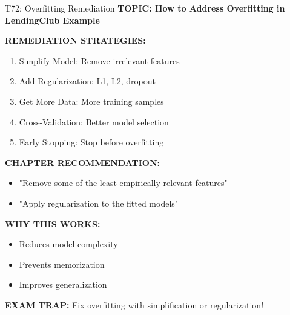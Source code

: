 \documentclass[8pt]{beamer}
\begin{document}
	\begin{frame}{T72: Overfitting Remediation}
		\fontsize{6.5}{7.5}\selectfont
		\textbf{TOPIC: How to Address Overfitting in LendingClub Example}
		
		\vspace{0.1cm}
		\textbf{REMEDIATION STRATEGIES:}
		\begin{enumerate}
			\item \textcolor{myblue}{Simplify Model:} Remove irrelevant features
			\item \textcolor{myblue}{Add Regularization:} L1, L2, dropout
			\item \textcolor{myblue}{Get More Data:} More training samples
			\item \textcolor{myblue}{Cross-Validation:} Better model selection
			\item \textcolor{myblue}{Early Stopping:} Stop before overfitting
		\end{enumerate}
		
		\vspace{0.1cm}
		\textbf{CHAPTER RECOMMENDATION:}
		\begin{itemize}
			\item "Remove some of the least empirically relevant features"
			\item "Apply regularization to the fitted models"
		\end{itemize}
		
		\vspace{0.1cm}
		\textbf{WHY THIS WORKS:}
		\begin{itemize}
			\item Reduces model complexity
			\item Prevents memorization
			\item Improves generalization
		\end{itemize}
		
		\textcolor{myred}{\textbf{EXAM TRAP:}} Fix overfitting with \textcolor{myblue}{simplification or regularization}!
	\end{frame}
	
\end{document}
